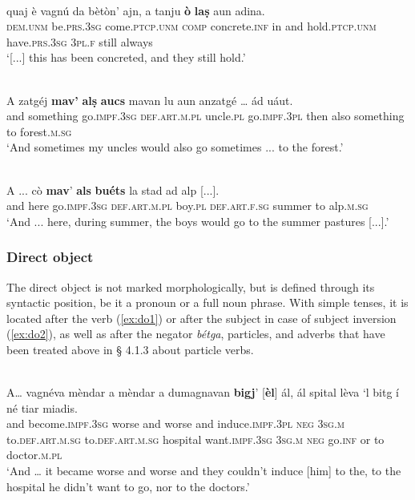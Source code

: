 \ea
\label{}
\\
\gll  [...] quaj è vagnú da bètòn’ ajn, a tanju \textbf{ò} \textbf{laṣ} aun adina. \\
{} \textsc{dem.unm} be.\textsc{prs.3sg} come.\textsc{ptcp.unm} \textsc{comp} concrete.\textsc{inf} in and hold.\textsc{ptcp.unm} have.\textsc{prs.3sg} \textsc{3pl.f} still always \\
\glt `[...] this has been concreted, and they still hold.'
\z


\ea
\label{}
\\
\gll   A zatgéj \textbf{mav'} \textbf{alṣ} \textbf{aucs} mavan lu aun anzatgé … ád uáut.\\
and something go.\textsc{impf.3sg}  \textsc{def.art.m.pl} uncle.\textsc{pl}  go.\textsc{impf.3pl} then also something {} to forest.\textsc{m.sg} \\
\glt `And sometimes my uncles would also go sometimes ... to the forest.'
\z

\ea
\label{}
\\
\gll  A ... cò \textbf{mav}’ \textbf{als} \textbf{buéts} la stad ad alp [...].  \\
and {} here go.\textsc{impf.3sg} \textsc{def.art.m.pl} boy.\textsc{pl} \textsc{def.art.f.sg} summer to alp.\textsc{m.sg}\\
\glt `And ... here, during summer, the boys would go to the summer pastures [...].'
\z


\subsubsection{Direct object}
The direct object is not marked morphologically, but is defined through its syntactic position, be it a pronoun or a full noun phrase. With simple tenses, it is located after the verb (\ref{ex:do1}) or after the subject in case of subject inversion (\ref{ex:do2}), as well as after the negator \textit{bétga}, particles, and adverbs that have been treated above in § 4.1.3 about particle verbs.

\ea
\label{ex:do1}
\\
\gll  A… vagnéva mèndar a mèndar a dumagnavan \textbf{bigj}' [\textbf{èl}] ál, ál spital lèva  `l bitg í né tiar miadis.  \\
and become.\textsc{impf.3sg} worse and worse and induce.\textsc{impf.3pl} \textsc{neg} \textsc{3sg.m} to.\textsc{def.art.m.sg} to.\textsc{def.art.m.sg} hospital want.\textsc{impf.3sg} \textsc{3sg.m} \textsc{neg} go.\textsc{inf} or to doctor.\textsc{m.pl} \\
\glt `And … it became worse and worse and they couldn’t induce [him] to the, to the hospital he didn’t want to go, nor to the doctors.'
\z

